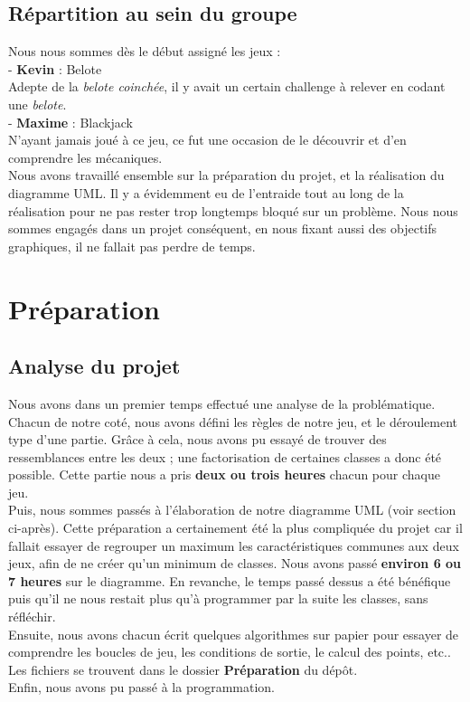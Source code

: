 \documentclass[a4paper]{report}
\begin{document}
\subsection{Répartition au sein du groupe}
Nous nous sommes dès le début assigné les jeux :\\
- \textbf{Kevin} : Belote \\
Adepte de la \textit{belote coinchée}, il y avait un certain challenge à relever en codant une \textit{belote}.\\
- \textbf{Maxime} : Blackjack \\
N'ayant jamais joué à ce jeu, ce fut une occasion de le découvrir et d'en comprendre les mécaniques.\\
Nous avons travaillé ensemble sur la préparation du projet, et la réalisation du diagramme UML. Il y a évidemment eu de l'entraide tout au long de la réalisation pour ne pas rester trop longtemps bloqué sur un problème. Nous nous sommes engagés dans un projet conséquent, en nous fixant aussi des objectifs graphiques, il ne fallait pas perdre de temps.

\newpage
\section{Préparation}
\subsection{Analyse du projet}
Nous avons dans un premier temps effectué une analyse de la problématique. Chacun de notre coté, nous avons défini les règles de notre jeu, et le déroulement type d'une partie. Grâce à cela, nous avons pu essayé de trouver des ressemblances entre les deux ; une factorisation de certaines classes a donc été possible. Cette partie nous a pris \textbf{deux ou trois heures} chacun pour chaque jeu.\\
Puis, nous sommes passés à l'élaboration de notre diagramme UML (voir section ci-après). Cette préparation a certainement été la plus compliquée du projet car il fallait essayer de regrouper un maximum les caractéristiques communes aux deux jeux, afin de ne créer qu'un minimum de classes. Nous avons passé \textbf{environ 6 ou 7 heures} sur le diagramme. En revanche, le temps passé dessus a été bénéfique puis qu'il ne nous restait plus qu'à programmer par la suite les classes, sans réfléchir.\\
Ensuite, nous avons chacun écrit quelques algorithmes sur papier pour essayer de comprendre les boucles de jeu, les conditions de sortie, le calcul des points, etc.. Les fichiers se trouvent dans le dossier \textbf{Préparation} du dépôt.\\
Enfin, nous avons pu passé à la programmation.
\end{document}

